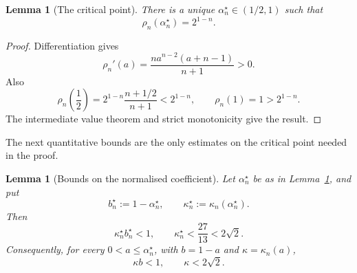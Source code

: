 \documentclass[11pt]{article}
\newtheorem{lemma}[theorem]{Lemma}
\theoremstyle{definition}
\theoremstyle{remark}
\begin{document}
\begin{lemma}[The critical point]
  \label{lem:critical-point}
  There is a unique $\alpha_n^\star\in(1/2,1)$ such that
  \begin{equation}
    \rho_n(\alpha_n^\star)=2^{1-n}.
    \label{eq:critical-n}
  \end{equation}
\end{lemma}

\begin{proof}
  Differentiation gives
  \[
    \rho_n'(a)
    =\frac{n a^{n-2}(a+n-1)}{n+1}>0.
  \]
  Also
  \[
    \rho_n\left(\frac12\right)
    =2^{1-n}\frac{n+1/2}{n+1}
    <2^{1-n},
    \qquad
    \rho_n(1)=1>2^{1-n}.
  \]
  The intermediate value theorem and strict monotonicity give the result.
\end{proof}

The next quantitative bounds are the only estimates on the critical point
needed in the proof.

\begin{lemma}[Bounds on the normalised coefficient]
  \label{lem:kappa-bounds}
  Let $\alpha_n^\star$ be as in Lemma~\ref{lem:critical-point}, and put
  \[
    b_n^\star:=1-\alpha_n^\star,
    \qquad
    \kappa_n^\star:=\kappa_n(\alpha_n^\star).
  \]
  Then
  \begin{equation}
    \kappa_n^\star b_n^\star<1,
    \qquad
    \kappa_n^\star<\frac{27}{13}<2\sqrt2.
    \label{eq:kappa-star-bounds}
  \end{equation}
  Consequently, for every $0<a\le\alpha_n^\star$, with $b=1-a$ and
  $\kappa=\kappa_n(a)$,
  \begin{equation}
    \kappa b<1,
    \qquad
    \kappa<2\sqrt2.
    \label{eq:kappa-bounds-all-a}
  \end{equation}
\end{lemma}
\end{document}
